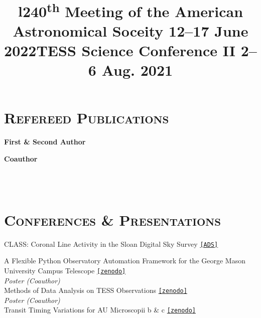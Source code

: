 \documentclass[marg, centered]{res}
\begin{document}
\begin{resume}
\section{{\scshape \bfseries Refereed Publications}}

\vspace{-0.1cm}
\textbf{First \& Second Author}
\vspace{0.05cm}

\textbf{Coauthor}
\vspace{0.05cm}
\vspace{0.05cm}


\begin{format}
\title{l} \\
 \\
\body
\end{format}

\section{{\scshape \bfseries Conferences \& Presentations}}


\title{\textbf{240\textsuperscript{th} Meeting of the American Astronomical Soceity} \hfill \textbf{12--17 June 2022}}
\begin{position}
CLASS: Coronal Line Activity in the Sloan Digital Sky Survey \href{https://ui.adsabs.harvard.edu/abs/2022AAS...24010113R/abstract}{\texttt{[ADS]}}
\end{position}

\vspace{-0.3cm}
\title{\textbf{TESS Science Conference II} \hfill \textbf{2--6 Aug. 2021}}
\begin{position}
A Flexible Python Observatory Automation Framework for the George Mason\\ University Campus Telescope \href{https://zenodo.org/record/5115310}{\texttt{[zenodo]}} \\
\textit{Poster (Coauthor)}\\
Methods of Data Analysis on TESS Observations \href{https://zenodo.org/record/5115310}{\texttt{[zenodo]}} \\
\textit{Poster (Coauthor)}\\
Transit Timing Variations for AU Microscopii b \& c \href{https://zenodo.org/record/5114040}{\texttt{[zenodo]}}
\end{position}


\end{resume}
\end{document}
